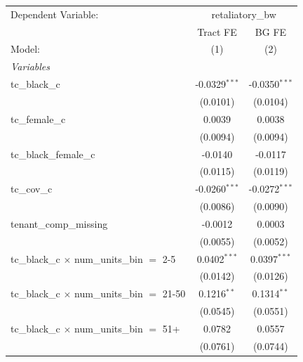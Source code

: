\centering
\begin{tabular}{lcc}
   \tabularnewline \midrule \midrule
   Dependent Variable: & \multicolumn{2}{c}{retaliatory\_bw}\\
                                                         & Tract FE        & BG FE \\   
   Model:                                                & (1)             & (2)\\  
   \midrule
   \emph{Variables}\\
   tc\_black\_c                                          & -0.0329$^{***}$ & -0.0350$^{***}$\\   
                                                         & (0.0101)        & (0.0104)\\   
   tc\_female\_c                                         & 0.0039          & 0.0038\\   
                                                         & (0.0094)        & (0.0094)\\   
   tc\_black\_female\_c                                  & -0.0140         & -0.0117\\   
                                                         & (0.0115)        & (0.0119)\\   
   tc\_cov\_c                                            & -0.0260$^{***}$ & -0.0272$^{***}$\\   
                                                         & (0.0086)        & (0.0090)\\   
   tenant\_comp\_missing                                 & -0.0012         & 0.0003\\   
                                                         & (0.0055)        & (0.0052)\\   
   tc\_black\_c $\times$ num\_units\_bin $=$ 2-5         & 0.0402$^{***}$  & 0.0397$^{***}$\\   
                                                         & (0.0142)        & (0.0126)\\   
   tc\_black\_c $\times$ num\_units\_bin $=$ 21-50       & 0.1216$^{**}$   & 0.1314$^{**}$\\   
                                                         & (0.0545)        & (0.0551)\\   
   tc\_black\_c $\times$ num\_units\_bin $=$ 51+         & 0.0782          & 0.0557\\   
                                                         & (0.0761)        & (0.0744)\\   

\end{tabular}
